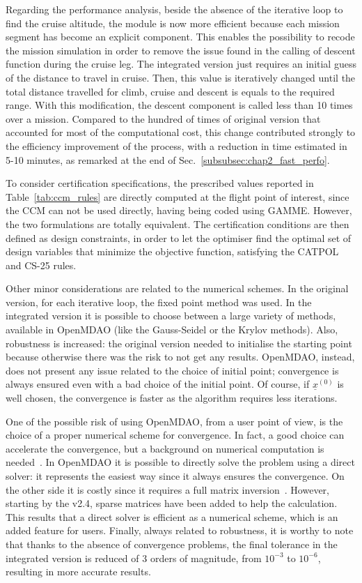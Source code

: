 Regarding the performance analysis, beside the absence of the iterative loop to find the cruise altitude, the module is now more efficient because each mission segment has become an explicit component. 
This enables the possibility to recode the mission simulation in order to remove the issue found in the calling of descent function during the cruise leg. 
The integrated version just requires an initial guess of the distance to travel in cruise. 
Then, this value is iteratively changed until the total distance travelled for climb, cruise and descent is equals to the required range. 
With this modification, the descent component is called less than 10 times over a mission.
Compared to the hundred of times of original version that accounted for most of the computational cost, this change contributed strongly to the efficiency improvement of the process, with a reduction in time estimated in 5-10 minutes, as remarked at the end of Sec.~\ref{subsubsec:chap2_fast_perfo}. 

To consider certification specifications, the prescribed values reported in Table~\ref{tab:ccm_rules} are directly computed at the flight point of interest, since the CCM can not be used directly, having being coded using GAMME. 
However, the two formulations are totally equivalent. 
The certification conditions are then defined as design constraints, in order to let the optimiser find the optimal set of design variables that minimize the objective function, satisfying the CATPOL and CS-25 rules. 

Other minor considerations are related to the numerical schemes.
In the original version, for each iterative loop, the fixed point method was used.
In the integrated version it is possible to choose between a large variety of methods, available in OpenMDAO (like the Gauss-Seidel or the Krylov methods).
Also, robustness is increased: the original version needed to initialise the starting point because otherwise there was the risk to not get 
any results. 
OpenMDAO, instead, does not present any issue related to the choice of initial point; convergence is always ensured even with a bad choice of the initial point. 
Of course, if $\underline{x}^{(0)}$ is well chosen, the convergence is faster as the algorithm requires less iterations.

One of the possible risk of using OpenMDAO, from a user point of view, is the choice of a proper numerical scheme for convergence. 
In fact, a good choice can accelerate the convergence, but a background on numerical computation is needed~\cite{bib:leveque_partial_equation}. 
In OpenMDAO it is possible to directly solve the problem using a direct solver: it represents the easiest way since it always ensures the convergence.
On the other side it is costly since it requires a full matrix inversion~\cite{bib:gray_omdao}. 
However, starting by the v2.4, sparse matrices have been added to help the calculation. 
This results that a direct solver is efficient as a numerical scheme, which is an added feature for users. 
Finally, always related to robustness, it is worthy to note that thanks to the absence of convergence problems, the final tolerance in the integrated version is reduced of 3 orders of magnitude, from $10^{-3}$ to $10^{-6}$, resulting in more accurate results.

